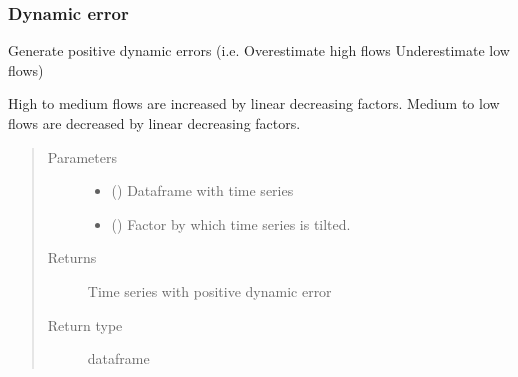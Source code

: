 \documentclass[letterpaper,10pt,english]{sphinxmanual}
\begin{document}
\subsubsection{Dynamic error}
\label{\detokenize{reference/generate_errors:dynamic-error}}

\begin{fulllineitems}
\label{\detokenize{reference/generate_errors:de.generate_errors.positive_dynamic}}
Generate positive dynamic errors (i.e. Overestimate high flows \sphinxhyphen{}
Underestimate low flows)

High to medium flows are increased by linear decreasing factors. Medium to
low flows are decreased by linear decreasing factors.
\begin{quote}\begin{description}
\item[{Parameters}] \leavevmode\begin{itemize}
\item {} 
 () \textendash{} Dataframe with time series

\item {} 
 (\sphinxstyleliteralemphasis{\sphinxupquote{, }}) \textendash{} Factor by which time series is tilted.

\end{itemize}

\item[{Returns}] \leavevmode
{} \textendash{} Time series with positive dynamic error

\item[{Return type}] \leavevmode
dataframe

\end{description}\end{quote}

\end{fulllineitems}

\end{document}
